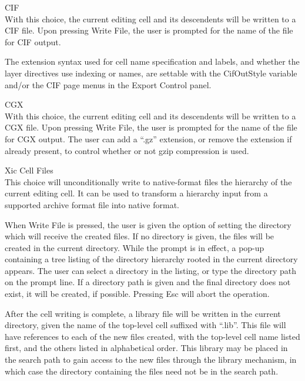 \begin{description}
\item{\cb CIF}\\
With this choice, the current editing cell and its descendents will be
written to a CIF file.  Upon pressing {\cb Write File}, the user is
prompted for the name of the file for CIF output.

The extension syntax used for cell name specification and labels, and
whether the layer directives use indexing or names, are settable with
the {\et CifOutStyle} variable and/or the {\cb CIF} page menus in the
{\cb Export Control} panel.

\item{\cb CGX}\\
With this choice, the current editing cell and its descendents will be
written to a CGX file.  Upon pressing {\cb Write File}, the user is
prompted for the name of the file for CGX output.  The user can add a
``{\vt .gz}'' extension, or remove the extension if already present,
to control whether or not {\vt gzip} compression is used.

\item{\cb Xic Cell Files}\\
This choice will unconditionally write to native-format files the
hierarchy of the current editing cell.  It can be used to transform a
hierarchy input from a supported archive format file into {\Xic}
native format.

When {\cb Write File} is pressed, the user is given the option of
setting the directory which will receive the created files.  If no
directory is given, the files will be created in the current
directory.  While the prompt is in effect, a pop-up containing a tree
listing of the directory hierarchy rooted in the current directory
appears.  The user can select a directory in the listing, or type the
directory path on the prompt line.  If a directory path is given and
the final directory does not exist, it will be created, if possible. 
Pressing {\kb Esc} will abort the operation.

After the cell writing is complete, a library file will be written in
the current directory, given the name of the top-level cell suffixed
with ``{\vt .lib}''.  This file will have references to each of the
new files created, with the top-level cell name listed first, and the
others listed in alphabetical order.  This library may be placed in
the search path to gain access to the new files through the library
mechanism, in which case the directory containing the files need not
be in the search path.
\end{description}

